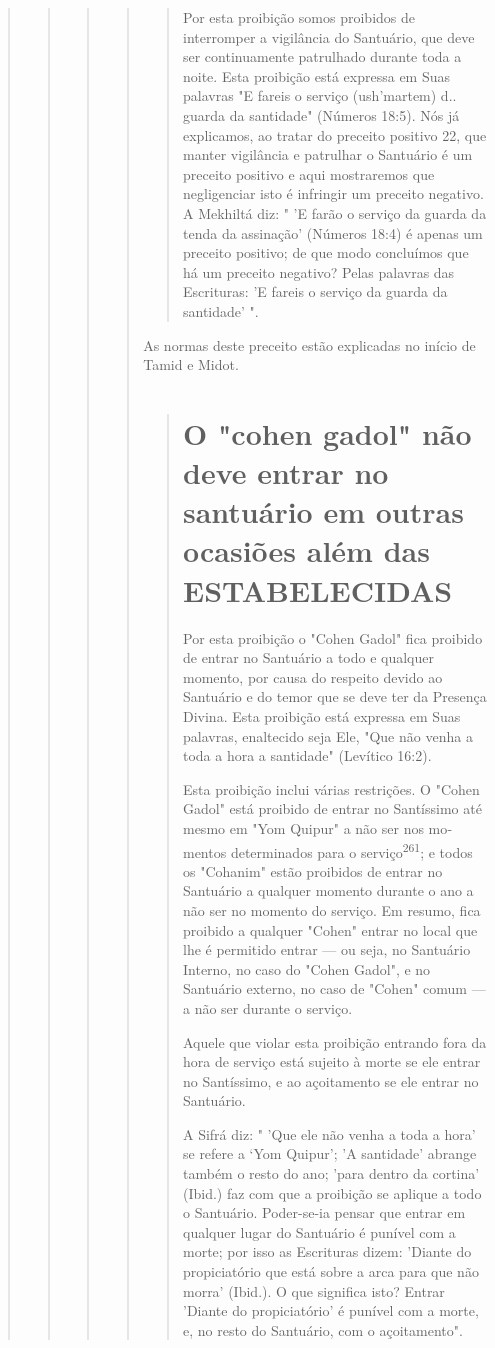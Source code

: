 \begin{quote}
\begin{quote}
\begin{quote}
\begin{quote}
\begin{quote}
Por esta proibição somos proibidos de interromper a vigilância do
Santuário, que deve ser continuamente patrulhado durante toda a noite.
Esta proibição está expressa em Suas palavras "E fareis o serviço
(ush'martem) d.. guarda da santidade" (Números 18:5). Nós já explicamos,
ao tratar do preceito positivo 22, que manter vigilância e patrulhar o
Santuário é um preceito positi­vo e aqui mostraremos que negligenciar
isto é infringir um preceito negativo. A Mekhiltá diz: " 'E farão o
serviço da guarda da tenda da assinação' (Números 18:4) é apenas um
preceito positivo; de que modo concluímos que há um pre­ceito negativo?
Pelas palavras das Escrituras: 'E fareis o serviço da guarda da
santidade' ".
\end{quote}

As normas deste preceito estão explicadas no início de Tamid e Midot.

\begin{quote}
\section{O "cohen gadol" não deve entrar no santuário 
em outras ocasiões além das ESTABELECIDAS}

Por esta proibição o "Cohen Gadol" fica proibido de entrar no San­tuário
a todo e qualquer momento, por causa do respeito devido ao Santuário e
do temor que se deve ter da Presença Divina. Esta proibição está
expressa em Suas palavras, enaltecido seja Ele, "Que não venha a toda a
hora a santida­de" (Levítico 16:2).

Esta proibição inclui várias restrições. O "Cohen Gadol" está proi­bido
de entrar no Santíssimo até mesmo em "Yom Quipur" a não ser nos
mo­mentos determinados para o serviço\textsuperscript{261}; e todos os
"Cohanim" estão proibi­dos de entrar no Santuário a qualquer momento
durante o ano a não ser no momento do serviço. Em resumo, fica proibido
a qualquer "Cohen" entrar no local que lhe é permitido entrar --- ou
seja, no Santuário Interno, no caso do "Cohen Gadol", e no Santuário
externo, no caso de "Cohen" comum --- a não ser durante o serviço.

Aquele que violar esta proibição entrando fora da hora de serviço está
sujeito à morte se ele entrar no Santíssimo, e ao açoitamento se ele
entrar no Santuário.

A Sifrá diz: " 'Que ele não venha a toda a hora' se refere a `Yom
Qui­pur'; 'A santidade' abrange também o resto do ano; 'para dentro da
cortina'
(Ibid.) faz com que a proibição se aplique a todo o Santuário.
Poder-se-ia pen­sar que entrar em qualquer lugar do Santuário é punível
com a morte; por isso as Escrituras dizem: 'Diante do propiciatório que
está sobre a arca para que não morra' (Ibid.). O que significa isto?
Entrar 'Diante do propiciatório' é punível com a morte, e, no resto do
Santuário, com o açoitamento".


\end{quote}
\end{quote}
\end{quote}
\end{quote}
\end{quote}
